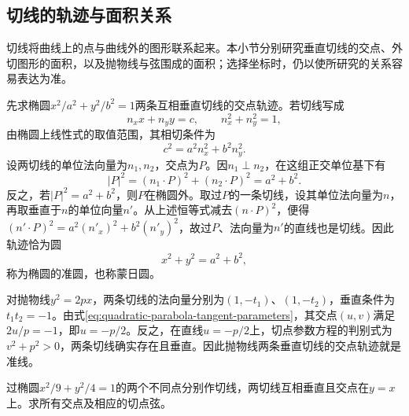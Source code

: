 \subsection{切线的轨迹与面积关系}
\label{subsec:quadratic-loci-and-areas}

切线将曲线上的点与曲线外的图形联系起来。本小节分别研究垂直切线的交点、外切图形的面积，以及抛物线与弦围成的面积；选择坐标时，仍以使所研究的关系容易表达为准。

先求椭圆\(x^2/a^2+y^2/b^2=1\)两条互相垂直切线的交点轨迹。若切线写成
\begin{equation*}
 n_xx+n_yy=c,\qquad n_x^2+n_y^2=1,
\end{equation*}
由椭圆上线性式的取值范围，其相切条件为
\begin{equation*}
 c^2=a^2n_x^2+b^2n_y^2.
\end{equation*}
设两切线的单位法向量为\(n_1,n_2\)，交点为\(P\)。因\(n_1\perp n_2\)，在这组正交单位基下有
\begin{equation*}
 |P|^2=(n_1\cdot P)^2+(n_2\cdot P)^2=a^2+b^2.
\end{equation*}
反之，若\(|P|^2=a^2+b^2\)，则\(P\)在椭圆外。取过\(P\)的一条切线，设其单位法向量为\(n\)，再取垂直于\(n\)的单位向量\(n'\)。从上述恒等式减去\((n\cdot P)^2\)，便得\((n'\cdot P)^2=a^2(n'_x)^2+b^2(n'_y)^2\)，故过\(P\)、法向量为\(n'\)的直线也是切线。因此轨迹恰为圆
\begin{equation}\label{eq:quadratic-ellipse-director-circle}
 x^2+y^2=a^2+b^2,
\end{equation}
称为椭圆的{\heiti{}准圆}，也称{\heiti{}蒙日圆}。

对抛物线\(y^2=2px\)，两条切线的法向量分别为\((1,-t_1)\)、\((1,-t_2)\)，垂直条件为\(t_1t_2=-1\)。由式\eqref{eq:quadratic-parabola-tangent-parameters}，其交点\((u,v)\)满足\(2u/p=-1\)，即\(u=-p/2\)。反之，在直线\(u=-p/2\)上，切点参数方程的判别式为\(v^2+p^2>0\)，两条切线确实存在且垂直。因此抛物线两条垂直切线的交点轨迹就是准线。

\par\noindent\begin{minipage}{\linewidth}
\begin{example}
过椭圆\(x^2/9+y^2/4=1\)的两个不同点分别作切线，两切线互相垂直且交点在\(y=x\)上。求所有交点及相应的切点弦。
\end{example}
\end{minipage}\par

